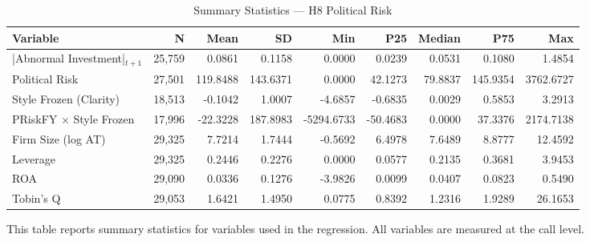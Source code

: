 \begin{table}[htbp]
\centering
\caption{Summary Statistics — H8 Political Risk}
\label{tab:summary_stats_h8}
\begin{tabular}{lrrrrrrrr}
\toprule
Variable & N & Mean & SD & Min & P25 & Median & P75 & Max \\
\midrule
|Abnormal Investment|$_{t+1}$ & 25,759 & 0.0861 & 0.1158 & 0.0000 & 0.0239 & 0.0531 & 0.1080 & 1.4854 \\
Political Risk & 27,501 & 119.8488 & 143.6371 & 0.0000 & 42.1273 & 79.8837 & 145.9354 & 3762.6727 \\
Style Frozen (Clarity) & 18,513 & -0.1042 & 1.0007 & -4.6857 & -0.6835 & 0.0029 & 0.5853 & 3.2913 \\
PRiskFY $\times$ Style Frozen & 17,996 & -22.3228 & 187.8983 & -5294.6733 & -50.4683 & 0.0000 & 37.3376 & 2174.7138 \\
Firm Size (log AT) & 29,325 & 7.7214 & 1.7444 & -0.5692 & 6.4978 & 7.6489 & 8.8777 & 12.4592 \\
Leverage & 29,325 & 0.2446 & 0.2276 & 0.0000 & 0.0577 & 0.2135 & 0.3681 & 3.9453 \\
ROA & 29,090 & 0.0336 & 0.1276 & -3.9826 & 0.0099 & 0.0407 & 0.0823 & 0.5490 \\
Tobin's Q & 29,053 & 1.6421 & 1.4950 & 0.0775 & 0.8392 & 1.2316 & 1.9289 & 26.1653 \\
\bottomrule
\end{tabular}
\begin{tablenotes}
\small
\item This table reports summary statistics for variables used in the regression.
All variables are measured at the call level.
\end{tablenotes}
\end{table}